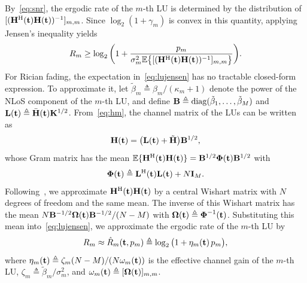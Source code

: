 \documentclass[journal]{IEEEtran}
\newcommand{\rev}[1]{{\color{red}#1}}
\newcommand{\rev}[1]{#1}
\begin{document}
By~\eqref{eq:snr}, the ergodic rate of the $m$-th LU is determined by the distribution of $[(\mathbf{H}^{\mathrm H}(\mathbf{t})\mathbf{H}(\mathbf{t}))^{-1}]_{m,m}$. Since $\log_2(1+\gamma_m)$ is convex in this quantity, applying Jensen's inequality yields
\begin{equation}\label{eq:lujensen}
R_m\ge\log_2\bigg(1+\frac{p_m}{\sigma_m^2\mathbb{E}\big\{[(\mathbf{H}^{\mathrm H}(\mathbf{t})\mathbf{H}(\mathbf{t}))^{-1}]_{m,m}\big\}}\bigg).
\end{equation}
For Rician fading, the expectation in~\eqref{eq:lujensen} has no \rev{tractable} closed-form expression. To approximate it, let $\tilde\beta_m\triangleq\beta_m/(\kappa_m+1)$ denote the power of the NLoS component of the $m$-th LU, and define $\mathbf{B}\triangleq\mathrm{diag}(\tilde\beta_1,\ldots,\tilde\beta_M)$ and $\mathbf{L}(\mathbf{t})\triangleq\bar{\mathbf{H}}(\mathbf{t})\mathbf{K}^{1/2}$. From~\eqref{eq:hm}, the channel matrix of the LUs can be written as
\begin{equation}\label{eq:Hdecomp}
\mathbf{H}(\mathbf{t})=\big(\mathbf{L}(\mathbf{t})+\tilde{\mathbf{H}}\big)\mathbf{B}^{1/2},
\end{equation}
whose Gram matrix has the mean $\mathbb{E}\{\mathbf{H}^{\mathrm H}(\mathbf{t})\mathbf{H}(\mathbf{t})\}=\mathbf{B}^{1/2}\boldsymbol{\Phi}(\mathbf{t})\mathbf{B}^{1/2}$ with
\begin{equation}\label{eq:Phi}
\boldsymbol{\Phi}(\mathbf{t})\triangleq\mathbf{L}^{\mathrm H}(\mathbf{t})\mathbf{L}(\mathbf{t})+N\mathbf{I}_M.
\end{equation}
Following~\cite{ZhangJSTSP2014}, we approximate $\mathbf{H}^{\mathrm H}(\mathbf{t})\mathbf{H}(\mathbf{t})$ by a central Wishart matrix with $N$ degrees of freedom and the same mean. The inverse of this Wishart matrix has the mean $N\mathbf{B}^{-1/2}\boldsymbol{\Omega}(\mathbf{t})\mathbf{B}^{-1/2}/(N-M)$ with $\boldsymbol{\Omega}(\mathbf{t})\triangleq\boldsymbol{\Phi}^{-1}(\mathbf{t})$. Substituting this mean into~\eqref{eq:lujensen}, we approximate the ergodic rate of the $m$-th LU by
\begin{equation}\label{eq:Rm}
R_m\approx\hat R_m(\mathbf{t},p_m)\triangleq\log_2\big(1+\eta_m(\mathbf{t})\,p_m\big),
\end{equation}
where $\eta_m(\mathbf{t})\triangleq\zeta_m(N-M)/(N\omega_m(\mathbf{t}))$ is the effective channel gain of the $m$-th LU, $\zeta_m\triangleq\tilde\beta_m/\sigma_m^2$, and $\omega_m(\mathbf{t})\triangleq[\boldsymbol{\Omega}(\mathbf{t})]_{m,m}$.
\end{document}

